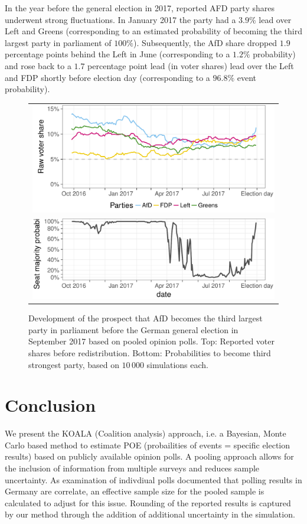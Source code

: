 \documentclass[smallcondensed]{svjour3}     %
\begin{document}
In the year before the general election in 2017, reported AFD party shares
underwent strong fluctuations. In January 2017 the party had a $3.9\%$ lead
over Left and Greens (corresponding to an estimated probability of becoming the
third largest party in parliament of $100\%$). Subsequently, the AfD share
dropped $1.9$ percentage points behind the Left in June
(corresponding to a $1.2\%$ probability)
and rose back to a $1.7$ percentage point lead (in voter shares) lead over the Left
and FDP shortly before election day (corresponding to a $96.8\%$ event probability).

\begin{figure}[H]\centering
\begin{tabular}{l}
\includegraphics[height=.2\textwidth]{figures/2017_pooled_afd_rawShares.pdf}
\\
\includegraphics[height=.15\textwidth]{figures/2017_pooled_afd_thirdPartyProb.pdf}
\end{tabular}
\caption{Development of the prospect that AfD becomes the third largest party
in parliament before the German general election in September 2017 based on pooled
opinion polls.
Top: Reported voter shares before redistribution.
Bottom: Probabilities to become third strongest party, based on $10\,000$ simulations each.
\label{fig:2017_afd}
}
\end{figure}


\section{Conclusion} \label{sec:conclusion}
We present the KOALA (Coalition analysis) approach, i.e. a Bayesian, Monte Carlo based method to estimate POE (probailities of events = specific election results) based on publicly available opinion polls. A pooling approach allows for the inclusion of information from multiple
surveys and reduces sample uncertainty. As examination of indivdiual polls documented that polling results in Germany are correlate, an effective sample size for the pooled sample is calculated to adjust for this issue. Rounding of the reported results is captured by our method through the addition of additional uncertainty in the simulation. \\
\end{document}

